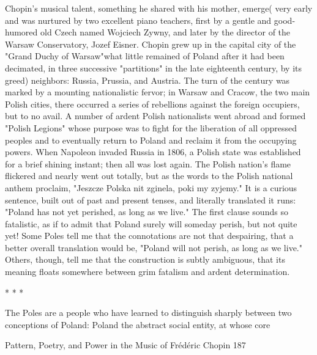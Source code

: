    Chopin's musical talent, something he shared with his mother, emerge( very early and
was nurtured by two excellent piano teachers, first by a gentle and good-humored old
Czech named Wojciech Zywny, and later by the director of the Warsaw Conservatory,
Jozef Eisner.
   Chopin grew up in the capital city of the "Grand Duchy of Warsaw"what little
remained of Poland after it had been decimated, in three successive "partitions" in the late
eighteenth century, by its greed) neighbors: Russia, Prussia, and Austria. The turn of the
century was marked by a mounting nationalistic fervor; in Warsaw and Cracow, the two
main Polish cities, there occurred a series of rebellions against the foreign occupiers, but
to no avail. A number of ardent Polish nationalists went abroad and formed "Polish
Legions" whose purpose was to fight for the liberation of all oppressed peoples and to
eventually return to Poland and reclaim it from the occupying powers. When Napoleon
invaded Russia in 1806, a Polish state was established for a brief shining instant; then all
was lost again. The Polish nation's flame flickered and nearly went out totally, but as the
words to the Polish national anthem proclaim, "Jeszcze Polska nit zginela, poki my
zyjemy." It is a curious sentence, built out of past and present tenses, and literally
translated it runs: "Poland has not yet perished, as long as we live." The first clause
sounds so fatalistic, as if to admit that Poland surely will someday perish, but not quite
yet! Some Poles tell me that the connotations are not that despairing, that a better overall
translation would be, "Poland will not perish, as long as we live." Others, though, tell me
that the construction is subtly ambiguous, that its meaning floats somewhere between
grim fatalism and ardent determination.

                                         *    *     *

The Poles are a people who have learned to distinguish sharply between two conceptions
of Poland: Poland the abstract social entity, at whose core




Pattern, Poetry, and Power in the Music of Frédéric Chopin                              187

